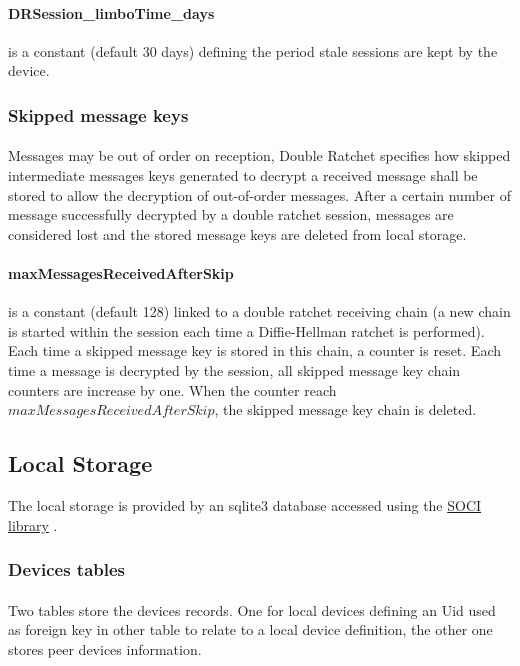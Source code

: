 \documentclass[a4paper,11pt]{article}
\begin{document}
      \paragraph{DRSession\_limboTime\_days}is a constant (default 30 days) defining the period stale sessions are kept by the device.
    
    \subsubsection{Skipped message keys}
      \paragraph{}Messages may be out of order on reception, Double Ratchet specifies how skipped intermediate messages keys generated to decrypt a received message shall be stored to allow the decryption of out-of-order messages. After a certain number of message successfully decrypted by a double ratchet session, messages are considered lost and the stored message keys are deleted from local storage.
      \paragraph{maxMessagesReceivedAfterSkip} is a constant (default 128) linked to a double ratchet receiving chain (a new chain is started within the session each time a Diffie-Hellman ratchet is performed). Each time a skipped message key is stored in this chain, a counter is reset. Each time a message is decrypted by the session, all skipped message key chain counters are increase by one. When the counter reach $maxMessagesReceivedAfterSkip$, the skipped message key chain is deleted.
    

  \subsection{Local Storage}
    The local storage is provided by an sqlite3 database accessed using the \href{https://github.com/SOCI/soci}{SOCI library} \cite{libsoci}.
    \subsubsection{Devices tables}
    \paragraph*{}Two tables store the devices records. One for local devices defining an Uid used as foreign key in other table to relate to a local device definition, the other one stores peer devices information.
\end{document}
